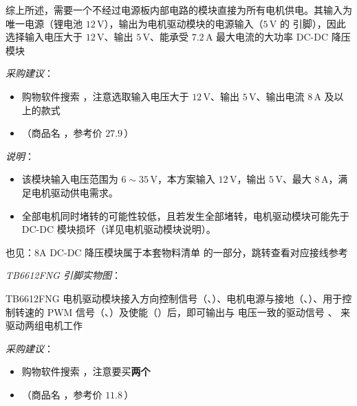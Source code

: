 \documentclass[11pt,a4paper]{article}
\begin{document}
综上所述，需要一个不经过电源板内部电路的模块直接为所有电机供电。其输入为唯一电源（锂电池 $12\,\mathrm{V}$），输出为电机驱动模块的电源输入（$5\,\mathrm{V}$ 的  引脚），因此选择输入电压大于 $12\,\mathrm{V}$、输出 $5\,\mathrm{V}$、能承受 $7.2\,\mathrm{A}$ 最大电流的大功率 DC-DC 降压模块

\emph{采购建议}：

\begin{itemize}
  \item 购物软件搜索 ，注意选取输入电压大于 $12\,\mathrm{V}$、输出 $5\,\mathrm{V}$、输出电流 $8\,\mathrm{A}$ 及以上的款式
  \item {}（商品名 ，参考价 $27.9$\,\yuan）
\end{itemize}

\emph{说明}：

\begin{itemize}
  \item 该模块输入电压范围为 $6\sim35\,\mathrm{V}$，本方案输入 $12\,\mathrm{V}$，输出 $5\,\mathrm{V}$、最大 $8\,\mathrm{A}$，满足电机驱动供电需求。
  \item 全部电机同时堵转的可能性较低，且若发生全部堵转，电机驱动模块可能先于 DC-DC 模块损坏（详见电机驱动模块说明）。
\end{itemize}

\begin{seealso}
  也见：8A DC-DC 降压模块属于本套物料清单  的一部分，跳转查看对应接线参考
\end{seealso}

\label{pt:driver}

\emph{TB6612FNG 引脚实物图}：


TB6612FNG 电机驱动模块接入方向控制信号（、）、电机电源与接地（、）、用于控制转速的 PWM 信号（、）及使能（）后，即可输出与  电压一致的驱动信号 、 来驱动两组电机工作

\emph{采购建议}：

\begin{itemize}
  \item 购物软件搜索 ，注意要买\textbf{两个}
  \item {}（商品名 ，参考价 $11.8$\,\yuan）
\end{itemize}
\end{document}

